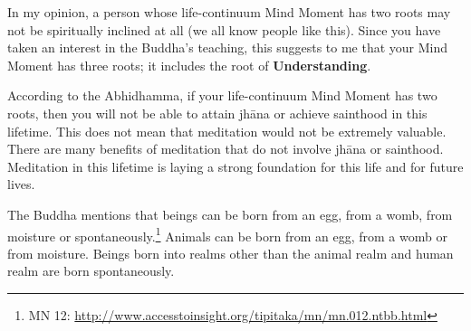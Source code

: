\pagebreak


In my opinion, a person whose life-continuum Mind Moment has two roots may not be spiritually inclined at all (we all know people like this). Since you have taken an interest in the Buddha's teaching, this suggests to me that your Mind Moment has three roots; it includes the root of \textbf{Understanding}.

According to the Abhidhamma, if your life-continuum Mind Moment has two roots, then you will not be able to attain jhāna or achieve sainthood in this lifetime. This does not mean that meditation would not be extremely valuable. There are many benefits of meditation that do not involve jhāna or sainthood. Meditation in this lifetime is laying a strong foundation for this life and for future lives.


The Buddha mentions that beings can be born from an egg, from a womb, from moisture or spontaneously.\footnote{MN 12: \url{http://www.accesstoinsight.org/tipitaka/mn/mn.012.ntbb.html}} Animals can be born from an egg, from a womb or from moisture. Beings born into realms other than the animal realm and human realm are born spontaneously.


